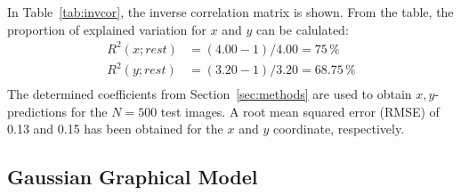 \documentclass{article}
\begin{document}
In Table~\ref{tab:invcor}, the inverse correlation matrix is
shown. From the table, the proportion of explained variation for $x$
and $y$ can be calulated:
\begin{align*}
  R^2(x; rest) &= (4.00 - 1) / 4.00 = 75\,\%\\
  R^2(y; rest) &= (3.20 - 1) / 3.20 = 68.75\,\%\\
\end{align*}
The determined coefficients from Section~\ref{sec:methods} are used to
obtain $x, y$-predictions for the $N = 500$ test images. A root mean
squared error (RMSE) of 0.13 and 0.15 has been obtained for the $x$
and $y$ coordinate, respectively.




\subsection{Gaussian Graphical Model}
\end{document}
